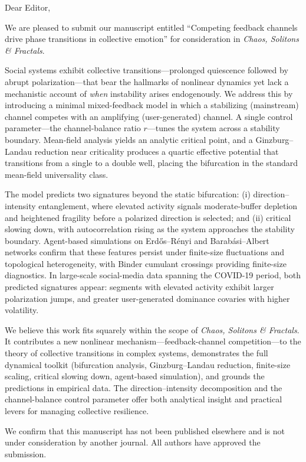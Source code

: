 \documentclass[11pt]{article}
\begin{document}
Dear Editor,

We are pleased to submit our manuscript entitled ``Competing feedback channels drive phase transitions in collective emotion'' for consideration in \textit{Chaos, Solitons \& Fractals}.

Social systems exhibit collective transitions---prolonged quiescence followed by abrupt polarization---that bear the hallmarks of nonlinear dynamics yet lack a mechanistic account of \emph{when} instability arises endogenously. We address this by introducing a minimal mixed-feedback model in which a stabilizing (mainstream) channel competes with an amplifying (user-generated) channel. A single control parameter---the channel-balance ratio $r$---tunes the system across a stability boundary. Mean-field analysis yields an analytic critical point, and a Ginzburg--Landau reduction near criticality produces a quartic effective potential that transitions from a single to a double well, placing the bifurcation in the standard mean-field universality class.

The model predicts two signatures beyond the static bifurcation: (i) direction--intensity entanglement, where elevated activity signals moderate-buffer depletion and heightened fragility before a polarized direction is selected; and (ii) critical slowing down, with autocorrelation rising as the system approaches the stability boundary. Agent-based simulations on Erd\H{o}s--R\'enyi and Barab\'asi--Albert networks confirm that these features persist under finite-size fluctuations and topological heterogeneity, with Binder cumulant crossings providing finite-size diagnostics. In large-scale social-media data spanning the COVID-19 period, both predicted signatures appear: segments with elevated activity exhibit larger polarization jumps, and greater user-generated dominance covaries with higher volatility.

We believe this work fits squarely within the scope of \textit{Chaos, Solitons \& Fractals}. It contributes a new nonlinear mechanism---feedback-channel competition---to the theory of collective transitions in complex systems, demonstrates the full dynamical toolkit (bifurcation analysis, Ginzburg--Landau reduction, finite-size scaling, critical slowing down, agent-based simulation), and grounds the predictions in empirical data. The direction--intensity decomposition and the channel-balance control parameter offer both analytical insight and practical levers for managing collective resilience.

We confirm that this manuscript has not been published elsewhere and is not under consideration by another journal. All authors have approved the submission.
\end{document}
